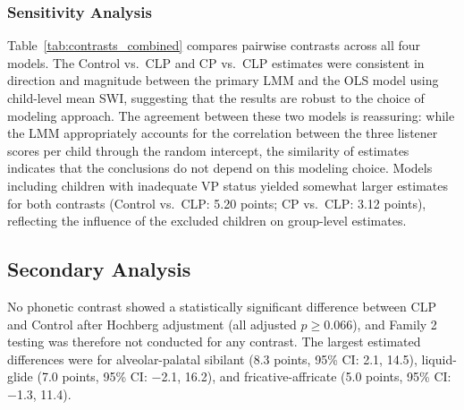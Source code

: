 \documentclass[11pt]{article}
\begin{document}
\subsubsection*{Sensitivity Analysis}
Table~\ref{tab:contrasts_combined} compares pairwise contrasts across all
four models. The Control vs.\ CLP and CP vs.\ CLP estimates were consistent
in direction and magnitude between the primary LMM and the OLS model using
child-level mean SWI, suggesting
that the results are robust to the choice of modeling approach. The agreement
between these two models is reassuring: while the LMM appropriately accounts
for the correlation between the three listener scores per child through the
random intercept, the similarity of estimates indicates that the conclusions
do not depend on this modeling choice. Models including children with
inadequate VP status yielded somewhat larger estimates for both contrasts
(Control vs.\ CLP: 5.20 points; CP vs.\ CLP: 3.12 points), reflecting the
influence of the excluded children on group-level estimates.

\begin{table}[H]
\centering
\caption{Pairwise contrasts with CLP across primary and sensitivity analyses.}
\label{tab:contrasts_combined}
\scriptsize
{}
\end{table}

\subsection*{Secondary Analysis}\label{sec:res-secondary}
No phonetic contrast showed a statistically significant difference between
CLP and Control after Hochberg adjustment (all adjusted $p \geq 0.066$),
and Family 2 testing was therefore not conducted for any contrast. The
largest estimated differences were for alveolar-palatal sibilant (8.3 points,
95\% CI: 2.1, 14.5), liquid-glide (7.0 points, 95\% CI: $-$2.1, 16.2),
and fricative-affricate (5.0 points, 95\% CI: $-$1.3, 11.4).
\end{document}
